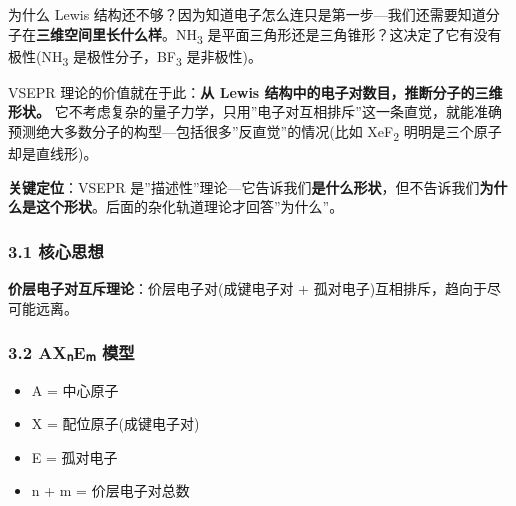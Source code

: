 为什么 Lewis 结构还不够？因为知道电子怎么连只是第一步---我们还需要知道分子在\textbf{三维空间里长什么样}。NH\textsubscript{3} 是平面三角形还是三角锥形？这决定了它有没有极性(NH\textsubscript{3} 是极性分子，BF\textsubscript{3} 是非极性)。

VSEPR 理论的价值就在于此：\textbf{从 Lewis 结构中的电子对数目，推断分子的三维形状。} 它不考虑复杂的量子力学，只用''电子对互相排斥''这一条直觉，就能准确预测绝大多数分子的构型---包括很多''反直觉''的情况(比如 XeF\textsubscript{2} 明明是三个原子却是直线形)。

\textbf{关键定位}：VSEPR 是''描述性''理论---它告诉我们\textbf{是什么形状}，但不告诉我们\textbf{为什么是这个形状}。后面的杂化轨道理论才回答''为什么''。

\subsubsection{3.1 核心思想}\label{ux6838ux5fc3ux601dux60f3}

\textbf{价层电子对互斥理论}：价层电子对(成键电子对 + 孤对电子)互相排斥，趋向于尽可能远离。

\subsubsection{3.2 AXₙEₘ 模型}\label{axux2099eux2098-ux6a21ux578b}

\begin{itemize}
\tightlist
\item
  A = 中心原子
\item
  X = 配位原子(成键电子对)
\item
  E = 孤对电子
\item
  n + m = 价层电子对总数
\end{itemize}

